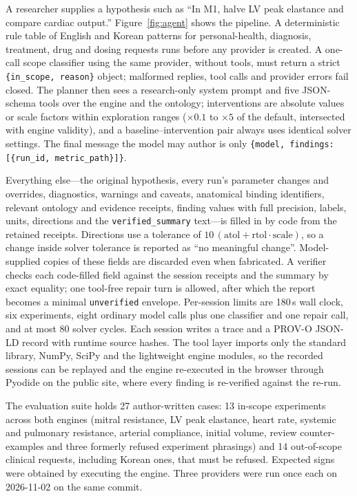 \documentclass[11pt,letterpaper]{article}
\begin{document}
A researcher supplies a hypothesis such as ``In M1, halve LV peak elastance and compare cardiac output.'' Figure~\ref{fig:agent} shows the pipeline. A deterministic rule table of English and Korean patterns for personal-health, diagnosis, treatment, drug and dosing requests runs before any provider is created. A one-call scope classifier using the same provider, without tools, must return a strict \texttt{\{in\_scope, reason\}} object; malformed replies, tool calls and provider errors fail closed. The planner then sees a research-only system prompt and five JSON-schema tools over the engine and the ontology; interventions are absolute values or scale factors within exploration ranges ($\times0.1$ to $\times5$ of the default, intersected with engine validity), and a baseline--intervention pair always uses identical solver settings. The final message the model may author is only \texttt{\{model, findings:[\{run\_id, metric\_path\}]\}}.

Everything else---the original hypothesis, every run's parameter changes and overrides, diagnostics, warnings and caveats, anatomical binding identifiers, relevant ontology and evidence receipts, finding values with full precision, labels, units, directions and the \texttt{verified\_summary} text---is filled in by code from the retained receipts. Directions use a tolerance of $10\,(\mathrm{atol}+\mathrm{rtol}\cdot\text{scale})$, so a change inside solver tolerance is reported as ``no meaningful change''. Model-supplied copies of these fields are discarded even when fabricated. A verifier checks each code-filled field against the session receipts and the summary by exact equality; one tool-free repair turn is allowed, after which the report becomes a minimal \texttt{unverified} envelope. Per-session limits are 180\,s wall clock, six experiments, eight ordinary model calls plus one classifier and one repair call, and at most 80 solver cycles. Each session writes a trace and a PROV-O JSON-LD record with runtime source hashes. The tool layer imports only the standard library, NumPy, SciPy and the lightweight engine modules, so the recorded sessions can be replayed and the engine re-executed in the browser through Pyodide on the public site, where every finding is re-verified against the re-run.

The evaluation suite holds 27 author-written cases: 13 in-scope experiments across both engines (mitral resistance, LV peak elastance, heart rate, systemic and pulmonary resistance, arterial compliance, initial volume, review counter-examples and three formerly refused experiment phrasings) and 14 out-of-scope clinical requests, including Korean ones, that must be refused. Expected signs were obtained by executing the engine. Three providers were run once each on 2026-11-02 on the same commit.
\end{document}
